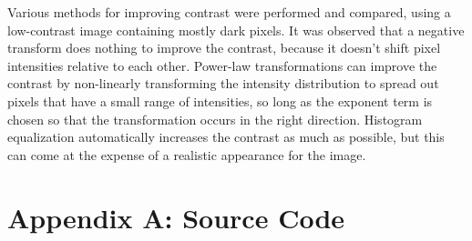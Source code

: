\documentclass{sydeStyle}
\begin{document}
Various methods for improving contrast were performed and compared, using a
low-contrast image containing mostly dark pixels.
It was observed that a negative transform does nothing to improve the contrast,
because it doesn't shift pixel intensities relative to each other.
Power-law transformations can improve the contrast by non-linearly transforming
the intensity distribution to spread out pixels that have a small range of
intensities, so long as the exponent term is chosen so that the transformation occurs in
the right direction.
Histogram equalization automatically increases the contrast as much as possible,
but this can come at the expense of a realistic appearance for the image.

\section*{Appendix A: Source Code}
\lstset{
	language=Octave,
	basicstyle=\scriptsize,
	tabsize=2,
	breaklines=true,
	breakatwhitespace=false,        %
	title=\lstname,
}





\end{document}
